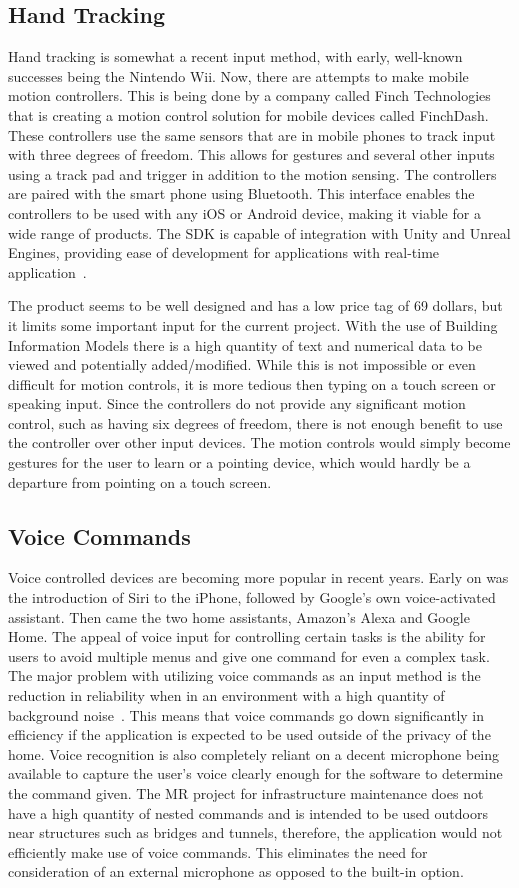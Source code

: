 \documentclass[10pt,draftclsnofoot,onecolumn,letterpaper]{IEEEtran}
\begin{document}
\subsection{Hand Tracking}
Hand tracking is somewhat a recent input method, with early, well-known successes being the Nintendo Wii. Now, there are attempts to make mobile motion controllers. This is being done by a company called Finch Technologies that is creating a motion control solution for mobile devices called FinchDash. These controllers use the same sensors that are in mobile phones to track input with three degrees of freedom. This allows for gestures and several other inputs using a track pad and trigger in addition to the motion sensing. The controllers are paired with the smart phone using Bluetooth. This interface enables the controllers to be used with any iOS or Android device, making it viable for a wide range of products. The SDK is capable of integration with Unity and Unreal Engines, providing ease of development for applications with real-time application~\cite{FD}.\par
The product seems to be well designed and has a low price tag of 69 dollars, but it limits some important input for the current project. With the use of Building Information Models there is a high quantity of text and numerical data to be viewed and potentially added/modified. While this is not impossible or even difficult for motion controls, it is more tedious then typing on a touch screen or speaking input. Since the controllers do not provide any significant motion control, such as having six degrees of freedom, there is not enough benefit to use the controller over other input devices. The motion controls would simply become gestures for the user to learn or a pointing device, which would hardly be a departure from pointing on a touch screen.

\subsection{Voice Commands}
Voice controlled devices are becoming more popular in recent years. Early on was the introduction of Siri to the iPhone, followed by Google's own voice-activated assistant. Then came the two home assistants, Amazon's Alexa and Google Home. The appeal of voice input for controlling certain tasks is the ability for users to avoid multiple menus and give one command for even a complex task. The major problem with utilizing voice commands as an input method is the reduction in reliability when in an environment with a high quantity of background noise~\cite{MRInput}. This means that voice commands go down significantly in efficiency if the application is expected to be used outside of the privacy of the home. Voice recognition is also completely reliant on a decent microphone being available to capture the user's voice clearly enough for the software to determine the command given. The MR project for infrastructure maintenance does not have a high quantity of nested commands and is intended to be used outdoors near structures such as bridges and tunnels, therefore, the application would not efficiently make use of voice commands. This eliminates the need for consideration of an external microphone as opposed to the built-in option.
\end{document}

